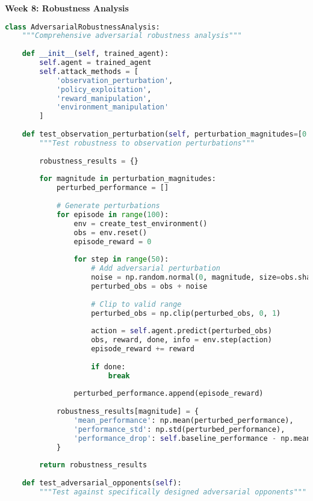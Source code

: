 \documentclass[12pt,a4paper]{article}
\begin{document}
\textbf{Week 8: Robustness Analysis}
\begin{lstlisting}[language=Python, caption=Adversarial Robustness Testing]
class AdversarialRobustnessAnalysis:
    """Comprehensive adversarial robustness analysis"""
    
    def __init__(self, trained_agent):
        self.agent = trained_agent
        self.attack_methods = [
            'observation_perturbation',
            'policy_exploitation', 
            'reward_manipulation',
            'environment_manipulation'
        ]
    
    def test_observation_perturbation(self, perturbation_magnitudes=[0.01, 0.05, 0.1]):
        """Test robustness to observation perturbations"""
        
        robustness_results = {}
        
        for magnitude in perturbation_magnitudes:
            perturbed_performance = []
            
            # Generate perturbations
            for episode in range(100):
                env = create_test_environment()
                obs = env.reset()
                episode_reward = 0
                
                for step in range(50):
                    # Add adversarial perturbation
                    noise = np.random.normal(0, magnitude, size=obs.shape)
                    perturbed_obs = obs + noise
                    
                    # Clip to valid range
                    perturbed_obs = np.clip(perturbed_obs, 0, 1)
                    
                    action = self.agent.predict(perturbed_obs)
                    obs, reward, done, info = env.step(action)
                    episode_reward += reward
                    
                    if done:
                        break
                
                perturbed_performance.append(episode_reward)
            
            robustness_results[magnitude] = {
                'mean_performance': np.mean(perturbed_performance),
                'performance_std': np.std(perturbed_performance),
                'performance_drop': self.baseline_performance - np.mean(perturbed_performance)
            }
        
        return robustness_results
    
    def test_adversarial_opponents(self):
        """Test against specifically designed adversarial opponents"""
        

\end{lstlisting}
\end{document}
